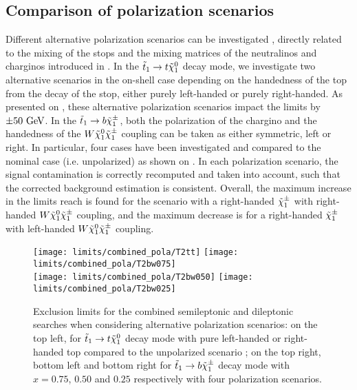     \subsection{Comparison of polarization scenarios}

    Different alternative polarization scenarios can be investigated
    \cite{polarization1, polarization2}, directly related to the mixing of the
    stops and the mixing matrices of the neutralinos and charginos introduced in
    . In the $\tilde{t}_1 \rightarrow t
    \tilde{\chi}_1^0$ decay mode, we investigate two alternative scenarios in the
    on-shell case depending on the handedness of the top from the decay of the
    stop, either purely left-handed or purely right-handed. As presented on
    , these alternative polarization
    scenarios impact the limits by $\pm 50~\text{GeV}$. In the $\tilde{t}_1 \rightarrow b
    \tilde{\chi}_1^\pm$, both the polarization of the chargino and the handedness of the
    $W\tilde{\chi}_1^0\tilde{\chi}_1^\pm$ coupling can be taken as either symmetric, left or
    right. In particular, four cases have been investigated and compared to the
    nominal case (i.e. unpolarized) as shown on
    .  In each polarization scenario, the
    signal contamination is correctly recomputed and taken into account, such
    that the corrected background estimation is consistent. Overall, the maximum
    increase in the limits reach is found for the scenario with a right-handed
    $\tilde{\chi}_1^\pm$ with right-handed $W\tilde{\chi}_1^0\tilde{\chi}_1^\pm$ coupling, and the
    maximum decrease is for a right-handed $\tilde{\chi}_1^\pm$ with left-handed
    $W\tilde{\chi}_1^0\tilde{\chi}_1^\pm$ coupling.

    \begin{figure}[h!]
        \centering
        \texttt{[image: limits/combined\_pola/T2tt]}
        \texttt{[image: limits/combined\_pola/T2bw075]}\\
        \texttt{[image: limits/combined\_pola/T2bw050]}
        \texttt{[image: limits/combined\_pola/T2bw025]}\\
        \caption{Exclusion limits for the combined semileptonic and dileptonic
        searches when considering alternative polarization scenarios: on the top
        left, for $\tilde{t}_1 \rightarrow t \tilde{\chi}_1^0$ decay mode with pure
        left-handed or right-handed top compared to the unpolarized scenario ;
        on the top right, bottom left and bottom right for $\tilde{t}_1 \rightarrow b
        \tilde{\chi}_1^\pm$ decay mode with $x=0.75$, $0.50$ and $0.25$ respectively
        with four polarization scenarios.}
        \label{fig:resultsCombinedPolarized}
    \end{figure}

